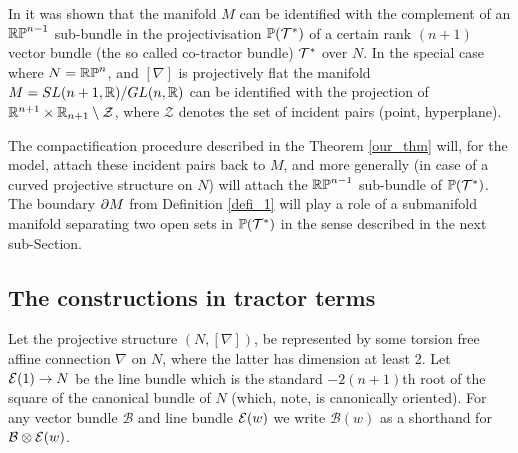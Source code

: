 In \cite{DM} it was shown that the manifold $M$ can be identified with the
complement of
an $\mathbb{RP}^{n-1}$ sub-bundle in the  projectivisation $\mathbb{P}(\mathcal{T}^*)$ of a certain rank $(n+1)$ vector bundle (the so called co-tractor bundle) $\mathcal{T}^*$  
over $N$. In the special case where $N=\mathbb{RP}^n$, and $[\nabla]$ is projectively 
flat the manifold $M=SL(n+1, \mathbb{R})/GL(n, \mathbb{R})$ can be identified with the projection of $\mathbb{R}^{n+1}\times \mathbb{R}_{n+1}\setminus {\mathcal Z}$, where ${\mathcal Z}$ denotes the set
of incident pairs (point, hyperplane).

The compactification procedure described in  
the Theorem \ref{our_thm} will, for the model, attach these incident pairs back to $M$, 
and more generally
(in case of a curved projective structure on $N$) will attach
the  $\mathbb{RP}^{n-1}$ sub-bundle of $\mathbb{P}(\mathcal{T}^*)$. The boundary $\partial M$ 
from Definition \ref{defi_1} will play a role of a submanifold manifold
separating two open sets in $\mathbb{P}(\mathcal{T}^*)$ in the sense described 
in the next sub-Section.

\subsection{The constructions in tractor terms}\label{tractor-ver}
Let the  projective structure $(N, [\nabla])$, be represented by
some torsion free affine connection $\nabla$ on $N$, where   the latter has
dimension at least 2.  Let $\mathcal{E}(1)\rightarrow N$ be  the line bundle which is the standard
$-2(n+1)$th root %
of the square of the canonical bundle of
$N$ (which, note, is canonically oriented).  For any
vector bundle $\mathcal{B}$ and line bundle $\mathcal{E}(w)$ we write
$\mathcal{B}(w)$ as a shorthand for $\mathcal{B}\otimes \mathcal{E}(w) $.

